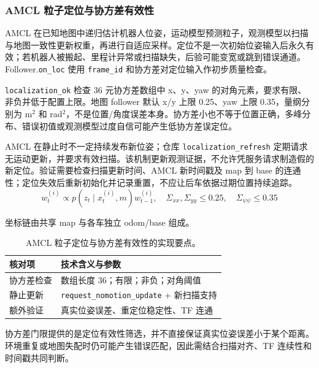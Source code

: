 \subsubsection{AMCL 粒子定位与协方差有效性}
AMCL 在已知地图中递归估计机器人位姿，运动模型预测粒子，观测模型以扫描与地图一致性更新权重，再进行自适应采样。定位不是一次初始位姿输入后永久有效；若机器人被搬起、里程计异常或扫描缺失，后验可能变宽或跳到错误通道。Follower.\texttt{on\_\allowbreak loc} 使用 \texttt{frame\_\allowbreak id} 和协方差对定位输入作初步质量检查。

\texttt{localization\_\allowbreak ok} 检查 36 元协方差数组中 x、y、yaw 的对角元素，要求有限、非负并低于配置上限。地图 follower 默认 x/y 上限 0.25、yaw 上限 0.35，量纲分别为 m\(^{2}\) 和 rad\(^{2}\)，不是位置/角度误差本身。协方差小也不等于位置正确，多峰分布、错误初值或观测模型过度自信可能产生低协方差误定位。

AMCL 在静止时不一定持续发布新位姿；仓库 \texttt{localization\_\allowbreak refresh} 定期请求无运动更新，并要求有效扫描。该机制更新观测证据，不允许凭服务请求制造假的新定位。验证需要检查扫描更新时间、AMCL 新时间戳及 map 到 base 的连通性；定位失效后重新初始化并记录重置，不应让后车依据过期位置持续追踪。
\begin{equation}
w_t^{(i)}\propto p(z_t\mid x_t^{(i)},m)w_{t-1}^{(i)},\quad \Sigma_{xx},\Sigma_{yy}\le0.25,\quad\Sigma_{\psi\psi}\le0.35
\end{equation}
\par 坐标链由共享 map 与各车独立 odom/base 组成。
\begin{table}[H]\centering\small
\begin{tabularx}{\linewidth}{p{27mm}X}\toprule
核对项 & 技术含义与参数\\\midrule
协方差检查 & 数组长度 36；有限；非负；对角阈值\\
静止更新 & \texttt{request\_\allowbreak nomotion\_\allowbreak update} + 新扫描支持\\
额外验证 & 真实位姿误差、重定位稳定性、TF 连通\\
\bottomrule\end{tabularx}
\caption{AMCL 粒子定位与协方差有效性的实现要点。}\end{table}

协方差门限提供的是定位有效性筛选，并不直接保证真实位姿误差小于某个距离。环境重复或地图失配时仍可能产生错误匹配，因此需结合扫描对齐、TF 连续性和时间戳共同判断。

